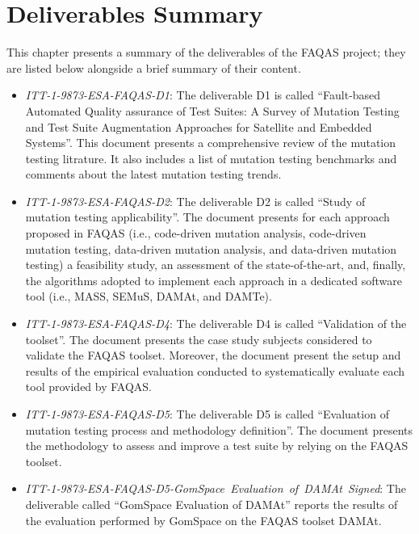 
\chapter{Deliverables Summary}

\label{chap:deliverables_summary}

This chapter presents a summary of the deliverables of the FAQAS project; they are listed below alongside a brief summary of their content.

\begin{itemize}
	\item \emph{ITT-1-9873-ESA-FAQAS-D1}: The deliverable D1 is called ``Fault-based Automated Quality assurance of Test Suites: A Survey of Mutation Testing and Test Suite Augmentation Approaches for Satellite and Embedded Systems''. This document presents a comprehensive review of the mutation testing litrature. It also includes a list of mutation testing benchmarks and comments about the latest mutation testing trends.

	\item \emph{ITT-1-9873-ESA-FAQAS-D2}: The deliverable D2 is called ``Study of mutation testing applicability''. The document presents for each approach proposed in FAQAS (i.e., code-driven mutation analysis, code-driven mutation testing, data-driven mutation analysis, and data-driven mutation testing) a feasibility study, an assessment of the state-of-the-art, and, finally, the algorithms adopted to implement each approach in a dedicated software tool (i.e., MASS, SEMuS, DAMAt, and DAMTe).

	\item \emph{ITT-1-9873-ESA-FAQAS-D4}: The deliverable D4 is called ``Validation of the toolset''. The document presents the case study subjects considered to validate the FAQAS toolset. Moreover, the document present the setup and results of the empirical evaluation conducted to systematically evaluate each tool provided by FAQAS.

	\item \emph{ITT-1-9873-ESA-FAQAS-D5}: The deliverable D5 is called ``Evaluation of mutation testing process and methodology definition''. The document presents the methodology to assess and improve a test suite by relying on the FAQAS toolset.

	\item \emph{ITT-1-9873-ESA-FAQAS-D5-GomSpace\ Evaluation\ of\ DAMAt\ Signed}: The deliverable called ``GomSpace Evaluation of DAMAt'' reports the results of the evaluation performed by GomSpace on the FAQAS toolset DAMAt.


\end{itemize}
